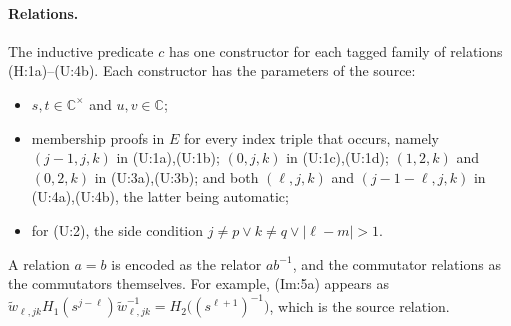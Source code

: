 \documentclass[11pt]{article}
\theoremstyle{definition}
\theoremstyle{remark}
\newcommand{\leanname}[1]{\texttt{\detokenize{#1}}}
\newcommand{\tw}{\widetilde{w}}
\newcommand{\Cx}{\mathbb{C}^{\times}}
\begin{document}
\paragraph{Relations.} The inductive predicate \leanname{Rel} $c$ has one constructor for each tagged family of relations (H:1a)--(U:4b). Each constructor has the parameters of the source:
\begin{itemize}
\item $s,t\in\Cx$ and $u,v\in\mathbb{C}$;
\item membership proofs in $E$ for every index triple that occurs, namely $(j-1,j,k)$ in (U:1a),(U:1b); $(0,j,k)$ in (U:1c),(U:1d); $(1,2,k)$ and $(0,2,k)$ in (U:3a),(U:3b); and both $(\ell,j,k)$ and $(j-1-\ell,j,k)$ in (U:4a),(U:4b), the latter being automatic;
\item for (U:2), the side condition $j\ne p\vee k\ne q\vee|\ell-m|>1$.
\end{itemize}
A relation $a=b$ is encoded as the relator $ab^{-1}$, and the commutator relations as the commutators themselves. For example, (Im:5a) appears as $\tw_{\ell,jk}H_1(s^{j-\ell})\tw_{\ell,jk}^{-1}=H_2\big((s^{\ell+1})^{-1}\big)$, which is the source relation.
\end{document}

